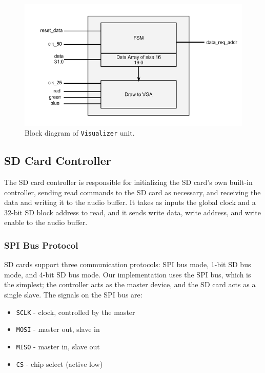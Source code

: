 \documentclass{article}
\begin{document}
\begin{figure}[H]
	\centering
	\includegraphics[scale=0.5]{viz_block_diagram.png}
	\caption{Block diagram of \texttt{Visualizer} unit.}
\end{figure}

\subsection{SD Card Controller}

The SD card controller is responsible for initializing the SD card's own
built-in controller, sending read commands to the SD card as necessary, and
receiving the data and writing it to the audio buffer.  It takes as inputs the
global clock and a 32-bit SD block address to read, and it sends write data,
write address, and write enable to the audio buffer.

\subsubsection{SPI Bus Protocol}

SD cards support three communication protocols: SPI bus mode, 1-bit SD bus
mode, and 4-bit SD bus mode. Our implementation uses the SPI bus, which is the
simplest; the controller acts as the master device, and the SD card acts as a
single slave.  The signals on the SPI bus are:

\begin{itemize}
	\item \texttt{SCLK} - clock, controlled by the master
	\item \texttt{MOSI} - master out, slave in
	\item \texttt{MISO} - master in, slave out
	\item \texttt{CS} - chip select (active low)
\end{itemize}
\end{document}
